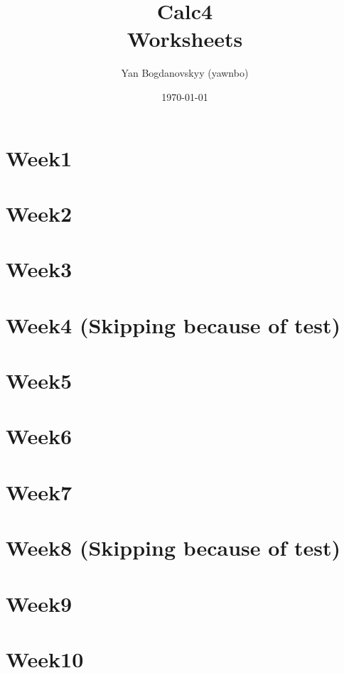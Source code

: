 \documentclass{report}
\title{\Huge{Calc4}\\ Worksheets}
\author{\huge{Yan Bogdanovskyy (yawnbo)}}
\date{\today}
\begin{document}
\maketitle
\tableofcontents
\pagebreak

\begin{multicols}{2}
\chapter{Week1}


\chapter{Week2}


\chapter{Week3}


\chapter{Week4 (Skipping because of test) }
\chapter{Week5}


\chapter{Week6}


\chapter{Week7}


\chapter{Week8 (Skipping because of test)}

\chapter{Week9}


\chapter{Week10}


\end{multicols}
\end{document}
